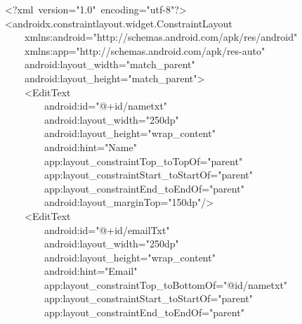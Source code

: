 {\ttfamily\small \textless{}?xml\ version="1.0"\ encoding="utf-8"?\textgreater{}} \\
{\ttfamily\small \textless{}androidx.constraintlayout.widget.ConstraintLayout} \\
{\ttfamily\small \ \ \ \ xmlns:android="http://schemas.android.com/apk/res/android"} \\
{\ttfamily\small \ \ \ \ xmlns:app="http://schemas.android.com/apk/res-auto"} \\
{\ttfamily\small \ \ \ \ android:layout\_width="match\_parent"} \\
{\ttfamily\small \ \ \ \ android:layout\_height="match\_parent"\textgreater{}} \\
{\ttfamily\small \ \ \ \ \textless{}EditText} \\
{\ttfamily\small \ \ \ \ \ \ \ \ android:id="@+id/nametxt"} \\
{\ttfamily\small \ \ \ \ \ \ \ \ android:layout\_width="250dp"} \\
{\ttfamily\small \ \ \ \ \ \ \ \ android:layout\_height="wrap\_content"} \\
{\ttfamily\small \ \ \ \ \ \ \ \ android:hint="Name"} \\
{\ttfamily\small \ \ \ \ \ \ \ \ app:layout\_constraintTop\_toTopOf="parent"} \\
{\ttfamily\small \ \ \ \ \ \ \ \ app:layout\_constraintStart\_toStartOf="parent"} \\
{\ttfamily\small \ \ \ \ \ \ \ \ app:layout\_constraintEnd\_toEndOf="parent"} \\
{\ttfamily\small \ \ \ \ \ \ \ \ android:layout\_marginTop="150dp"/\textgreater{}} \\
{\ttfamily\small \ \ \ \ \textless{}EditText} \\
{\ttfamily\small \ \ \ \ \ \ \ \ android:id="@+id/emailTxt"} \\
{\ttfamily\small \ \ \ \ \ \ \ \ android:layout\_width="250dp"} \\
{\ttfamily\small \ \ \ \ \ \ \ \ android:layout\_height="wrap\_content"} \\
{\ttfamily\small \ \ \ \ \ \ \ \ android:hint="Email"} \\
{\ttfamily\small \ \ \ \ \ \ \ \ app:layout\_constraintTop\_toBottomOf="@id/nametxt"} \\
{\ttfamily\small \ \ \ \ \ \ \ \ app:layout\_constraintStart\_toStartOf="parent"} \\
{\ttfamily\small \ \ \ \ \ \ \ \ app:layout\_constraintEnd\_toEndOf="parent"} \\
